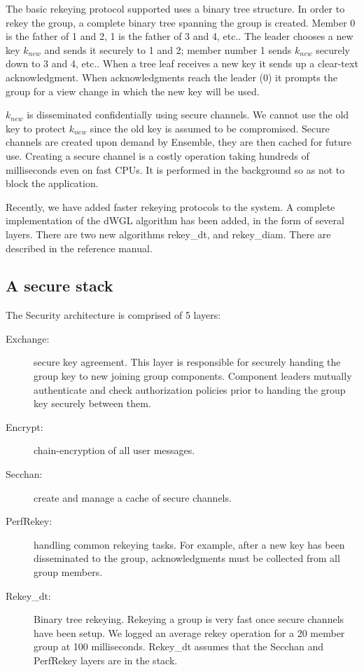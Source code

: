 The basic rekeying protocol supported uses a binary tree structure.
In order to rekey the group, a complete binary tree spanning the group
is created. Member 0 is the father of 1 and 2, 1 is the father of 3
and 4, etc.. The leader chooses a new key $k_{new}$ and sends it securely to 1
and 2; member number 1 sends $k_{new}$ securely down to 3 and 4, etc.. When a tree
leaf receives a new key it sends up a clear-text acknowledgment. When
acknowledgments reach the leader (0) it prompts the group for a view
change in which the new key will be used. 

$k_{new}$ is disseminated confidentially using secure channels. We
cannot use the old key to protect $k_{new}$ since the old key is
assumed to be compromised. Secure channels are created upon
demand by Ensemble, they are then cached for future use. Creating a secure
channel is a costly operation taking hundreds of milliseconds even on
fast CPUs. It is performed in the background so as not to block the
application.

Recently, we have added faster rekeying protocols to the system. A
complete implementation of the dWGL algorithm has been added, in the
form of several layers. There are two new algorithms rekey\_dt, and
rekey\_diam. There are described in the reference manual. 

\subsection{A secure stack}
The Security architecture is comprised of 5 layers:
\begin{description}
\item
[Exchange:] secure key agreement. This layer is responsible for
securely handing the group key to new joining group components. Component
leaders mutually authenticate and check authorization policies prior
to handing the group key securely between them.
\item
[Encrypt:] chain-encryption of all user messages.
\item 
[Secchan:] create and manage a cache of secure channels. 
\item 
[PerfRekey:] handling common rekeying tasks. For example, after a new
key has been disseminated to the group, acknowledgments must be
collected from all group members.
\item
[Rekey\_dt:] Binary tree rekeying. Rekeying a group is very fast once secure
channels have been setup. We logged an average rekey operation for a 20 member
group at 100 milliseconds. Rekey\_dt assumes that the Secchan and
PerfRekey layers are in the stack. 
\end{description}

